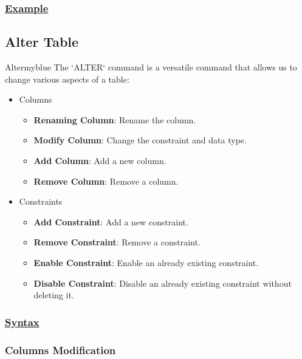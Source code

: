 

\subsubsection*{\underline{Example}}



\subsection{Alter Table}
\begin{prettyBox}{Alter}{myblue}
The `ALTER` command is a versatile command that allows us to change various aspects of a table:
\begin{itemize}
    \item Columns
        \begin{itemize}
            \item \textbf{Renaming Column}: Rename the column.
            \item \textbf{Modify Column}: Change the constraint and data type.
            \item \textbf{Add Column}: Add a new column.
            \item \textbf{Remove Column}: Remove a column.
        \end{itemize}
    \item Constraints
        \begin{itemize}
            \item \textbf{Add Constraint}: Add a new constraint. 
            \item \textbf{Remove Constraint}: Remove a constraint.
            \item \textbf{Enable Constraint}: Enable an already existing constraint.
            \item \textbf{Disable Constraint}: Disable an already existing constraint without deleting it.
        \end{itemize}
\end{itemize}
\end{prettyBox}

\subsubsection*{\underline{Syntax}}

\subsubsection*{Columns Modification}

